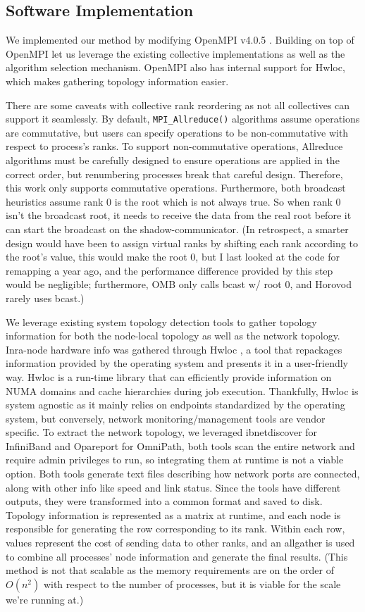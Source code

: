 \subsection{Software Implementation}
We implemented our method by modifying OpenMPI v4.0.5 \cite{gabriel2004OpenMPI}.
Building on top of OpenMPI let us leverage the existing collective implementations as well as the algorithm selection mechanism.
OpenMPI also has internal support for Hwloc, which makes gathering topology information easier.

There are some caveats with collective rank reordering as not all collectives can support it seamlessly.
By default, \texttt{MPI\_Allreduce()} algorithms assume operations are commutative, but users can specify operations to be non-commutative with respect to process's ranks. 
To support non-commutative operations, Allreduce algorithms must be carefully designed to ensure operations are applied in the correct order, but renumbering processes break that careful design.
Therefore, this work only supports commutative operations.
Furthermore, both broadcast heuristics assume rank 0 is the root which is not always true. 
So when rank 0 isn't the broadcast root, it needs to receive the data from the real root before it can start the broadcast on the shadow-communicator.
(In retrospect, a smarter design would have been to assign virtual ranks by shifting each rank according to the root's value, this would make the root 0, but I last looked at the code for remapping a year ago, and the performance difference provided by this step would be negligible; furthermore, OMB only calls bcast w/ root 0, and Horovod rarely uses bcast.)

We leverage existing system topology detection tools to gather topology information for both the node-local topology as well as the network topology.
Inra-node hardware info was gathered through Hwloc \cite{Broquedis2010hwloc}, a tool that repackages information provided by the operating system and presents it in a user-friendly way.
Hwloc is a run-time library that can efficiently provide information on NUMA domains and cache hierarchies during job execution.
Thankfully, Hwloc is system agnostic as it mainly relies on endpoints standardized by the operating system, but conversely, network monitoring/management tools are vendor specific.
To extract the network topology, we leveraged ibnetdiscover for InfiniBand and Opareport for OmniPath, both tools scan the entire network and require admin privileges to run, so integrating them at runtime is not a viable option.
Both tools generate text files describing how network ports are connected, along with other info like speed and link status.
Since the tools have different outputs, they were transformed into a common format and saved to disk.
Topology information is represented as a matrix at runtime, and each node is responsible for generating the row corresponding to its rank.
Within each row, values represent the cost of sending data to other ranks, and an allgather is used to combine all processes' node information and generate the final results.
(This method is not that scalable as the memory requirements are on the order of $O(n^2)$ with respect to the number of processes, but it is viable for the scale we're running at.)

